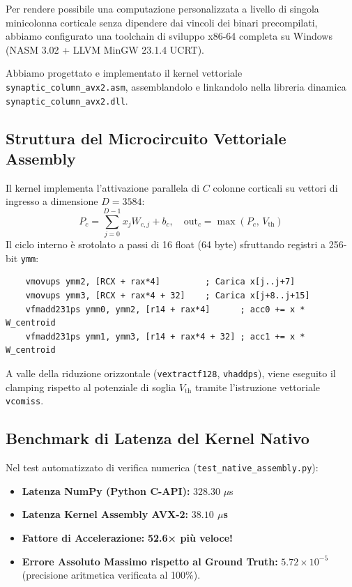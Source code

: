 \documentclass[10pt,a4paper]{article}
\theoremstyle{definition}
\begin{document}
Per rendere possibile una computazione personalizzata a livello di singola minicolonna corticale senza dipendere dai vincoli dei binari precompilati, abbiamo configurato una toolchain di sviluppo x86-64 completa su Windows (NASM 3.02 + LLVM MinGW 23.1.4 UCRT).

Abbiamo progettato e implementato il kernel vettoriale \texttt{synaptic\_column\_avx2.asm}, assemblandolo e linkandolo nella libreria dinamica \texttt{synaptic\_column\_avx2.dll}.

\subsection{Struttura del Microcircuito Vettoriale Assembly}
Il kernel implementa l'attivazione parallela di $C$ colonne corticali su vettori di ingresso a dimensione $D = 3584$:
\begin{equation}
P_c = \sum_{j=0}^{D-1} x_j W_{c, j} + b_c, \quad \text{out}_c = \max(P_c, \, V_{\text{th}})
\end{equation}
Il ciclo interno è srotolato a passi di 16 float (64 byte) sfruttando registri a 256-bit \texttt{ymm}:
\begin{verbatim}
    vmovups ymm2, [RCX + rax*4]         ; Carica x[j..j+7]
    vmovups ymm3, [RCX + rax*4 + 32]    ; Carica x[j+8..j+15]
    vfmadd231ps ymm0, ymm2, [r14 + rax*4]      ; acc0 += x * W_centroid
    vfmadd231ps ymm1, ymm3, [r14 + rax*4 + 32] ; acc1 += x * W_centroid
\end{verbatim}
A valle della riduzione orizzontale (\texttt{vextractf128}, \texttt{vhaddps}), viene eseguito il clamping rispetto al potenziale di soglia $V_{\text{th}}$ tramite l'istruzione vettoriale \texttt{vcomiss}.

\subsection{Benchmark di Latenza del Kernel Nativo}
Nel test automatizzato di verifica numerica (\texttt{test\_native\_assembly.py}):
\begin{itemize}[leftmargin=1.5em]
    \item \textbf{Latenza NumPy (Python C-API):} $328.30$ $\mu$s
    \item \textbf{Latenza Kernel Assembly AVX-2:} \textbf{$38.10$ $\mu$s}
    \item \textbf{Fattore di Accelerazione:} \textbf{52.6× più veloce!}
    \item \textbf{Errore Assoluto Massimo rispetto al Ground Truth:} $5.72 \times 10^{-5}$ (precisione aritmetica verificata al 100\%).
\end{itemize}
\end{document}
